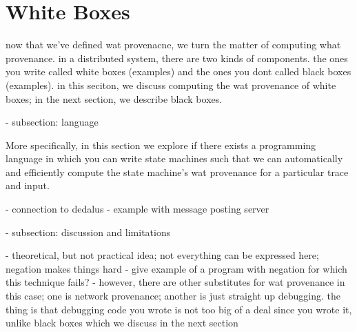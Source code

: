 \section{White Boxes}
now that we've defined wat provenacne, we turn the matter of computing what provenance. in a distributed system, there are two kinds of components. the ones you write called white boxes (examples) and the ones you dont called black boxes (examples). in this seciton, we discuss computing the wat provenance of white boxes; in the next section, we describe black boxes.

- subsection: language

More specifically, in this section we explore if there exists a programming language in which you can write state machines such that we can automatically and efficiently compute the state machine's wat provenance for a particular trace and input.

- connection to dedalus
- example with message posting server

- subsection: discussion and limitations

- theoretical, but not practical idea; not everything can be expressed here;
negation makes things hard
- give example of a program with negation for which this technique fails?
- however, there are other substitutes for wat provenance in this case; one is network provenance; another is just straight up debugging. the thing is that debugging code you wrote is not too big of a deal since you wrote it, unlike black boxes which we discuss in the next section
